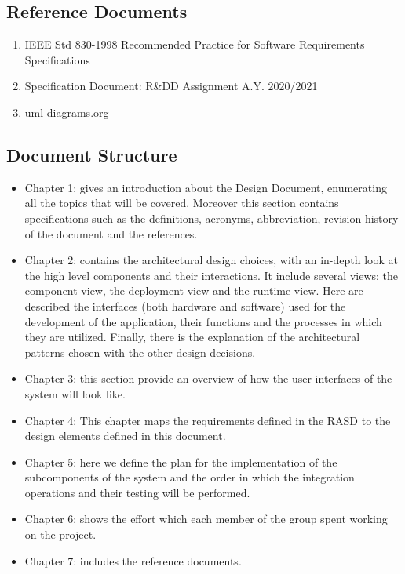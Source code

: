 \subsection{Reference Documents}
\begin{enumerate}
	\item IEEE Std 830-1998 Recommended Practice for Software Requirements Specifications
	\item Specification Document: R\&DD Assignment A.Y. 2020/2021
	\item uml-diagrams.org
\end{enumerate}
\subsection{Document Structure}
\begin{itemize}
	\item Chapter 1: gives an introduction about the Design Document, enumerating all the topics that will be covered. Moreover this section contains specifications such as the definitions, acronyms, abbreviation,	revision history of the document and the references.
	\item Chapter 2: contains the architectural design choices, with an in-depth look at the high level components and their interactions. It include several views: the component view, the deployment view and the runtime view. Here are described the interfaces (both hardware and software) used for the development of the application, their functions and the processes in which they are utilized. Finally, there is the explanation of the architectural patterns chosen with the other design decisions.
	\item Chapter 3: this section provide an overview of how the user interfaces of the system will look like.
	\item Chapter 4: This chapter maps the requirements defined in the RASD to the design elements defined in this document. 
	\item Chapter 5: here we define the plan for the implementation of the subcomponents of the system and the order in which the integration operations and their testing will be performed.
	\item Chapter 6: shows the effort which each member of the group spent working on the project.
	\item Chapter 7: includes the reference documents.
\end{itemize}


